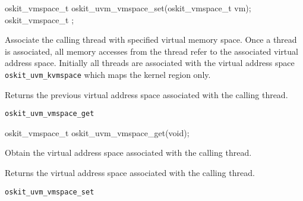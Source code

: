 \begin{apisyn}

        \funcproto oskit_vmspace_t      oskit_uvm_vmspace_set(oskit_vmspace_t vm);
        oskit_vmspace_t      ;
\end{apisyn}
\begin{apidesc}
        Associate the calling thread with specified virtual memory
        space.  Once a thread is associated, all memory accesses from
        the thread refer to the associated virtual address space.
        Initially all threads are associated with the virtual address
        space \texttt{oskit_uvm_kvmspace} which maps the kernel region only.
\end{apidesc}
\begin{apiret}
        Returns the previous virtual address space associated with the
        calling thread.
\end{apiret}
\begin{apirel}
        {\tt oskit_uvm_vmspace_get}
\end{apirel}

\begin{apisyn}

        \funcproto oskit_vmspace_t      oskit_uvm_vmspace_get(void);
\end{apisyn}
\begin{apidesc}
        Obtain the virtual address space associated with the calling thread.
\end{apidesc}
\begin{apiret}
        Returns the virtual address space associated with the calling thread.
\end{apiret}
\begin{apirel}
        {\tt oskit_uvm_vmspace_set}
\end{apirel}

